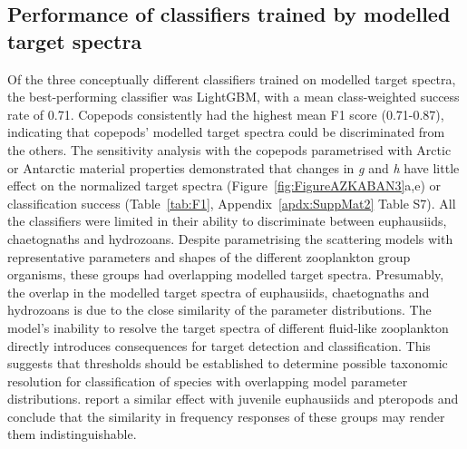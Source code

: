 \subsection{Performance of classifiers trained by modelled target spectra}
Of the three conceptually different classifiers trained on modelled target spectra, the best-performing classifier was LightGBM, with a mean class-weighted success rate of 0.71. Copepods consistently had the highest mean F1 score (0.71-0.87), indicating that copepods' modelled target spectra could be discriminated from the others. The sensitivity analysis with the copepods parametrised with Arctic or Antarctic material properties demonstrated that changes in \textit{g} and \textit{h} have little effect on the normalized target spectra (Figure~\ref{fig:FigureAZKABAN3}a,e) or classification success (Table~\ref{tab:F1}, Appendix~\ref{apdx:SuppMat2} Table S7). All the classifiers were limited in their ability to discriminate between euphausiids, chaetognaths and hydrozoans. Despite parametrising the scattering models with representative parameters and shapes of the different zooplankton group organisms, these groups had overlapping modelled target spectra. Presumably, the overlap in the modelled target spectra of euphausiids, chaetognaths and hydrozoans is due to the close similarity of the parameter distributions. The model's inability to resolve the target spectra of different fluid-like zooplankton directly introduces consequences for target detection and classification. This suggests that thresholds should be established to determine possible taxonomic resolution for classification of species with overlapping model parameter distributions. \cite{Ross2013} report a similar effect with juvenile euphausiids and pteropods and conclude that the similarity in frequency responses of these groups may render them indistinguishable. \\
